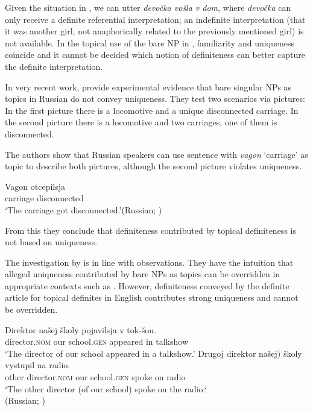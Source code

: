 \documentclass[output=paper,
colorlinks,
citecolor=brown,
newtxmath
]{langscibook}
\begin{document}
\noindent Given the situation in , we can utter \textit{devočka vošla v dom}, where \textit{devočka} can only receive a definite referential interpretation; an indefinite interpretation (that it was another girl, not anaphorically related to the previously mentioned girl) is not available. In the topical use of the bare NP in , familiarity and uniqueness coincide and it cannot be decided which notion of definiteness can better capture the definite interpretation.

In very recent work, \cite{Simik.Demian2020} provide experimental evidence that bare singular NPs as topics in Russian do not convey uniqueness. They test two scenarios via pictures: In the first picture there is a locomotive and a unique disconnected carriage. In the second picture there is a locomotive and two carriages, one of them is disconnected.

The authors show that Russian speakers can use sentence  with \textit{vagon} `carriage' as topic to describe both pictures, although the second picture violates uniqueness.

\ea \label{ex:10}
\gll Vagon    otcepilsja \\
    carriage  disconnected\\
\glt `The carriage got disconnected.'\hfill (Russian; \citealt[15]{Simik.Demian2020})
\z

\noindent From this they conclude that definiteness contributed by topical definiteness is not based on uniqueness.

The investigation by  is in line with  observations. They have the intuition that alleged uniqueness contributed by bare NPs as topics can be overridden in appropriate contexts such as . However, definiteness conveyed by the definite article for topical definites in English contributes strong uniqueness and cannot be overridden.

\ea \label{ex:11}
\ea
\gll Direktor našej školy pojavilsja v tok-šou. \\
    director.\textsc{nom} our school.\textsc{gen} appeared in talkshow\\
\glt `The director of our school appeared in a talkshow.'
\ex
\gll Drugoj direktor \minsp{(} našej) školy vystupil na radio. \\
 other director.\textsc{nom} {} our school.\textsc{gen} spoke on radio\\
\glt  `The other director (of our school) spoke on the radio.`\\
\glt \hfill (Russian; )
\z\z
\end{document}
